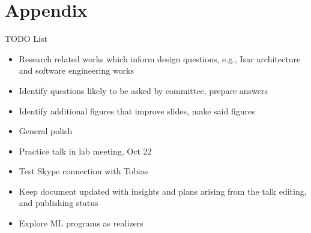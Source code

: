 \documentclass[slidestop,aspectratio=169]{beamer}
\theoremstyle{plain}
\theoremstyle{definition}
\theoremstyle{remark}
\begin{document}



\appendix
\section{Appendix}

\begin{frame}[t,allowframebreaks]{TODO List}
  \begin{itemize}
  \item Research related works which inform design questions, e.g., Isar architecture and software engineering works
  \item Identify questions likely to be asked by committee, prepare answers
  \item Identify additional figures that improve slides, make said figures
  \item General polish
  \item Practice talk in lab meeting, Oct 22
  \item Test Skype connection with Tobias
  \item Keep document updated with insights and plans arising from the talk editing, and publishing status
  \item Explore ML programs as realizers
  \end{itemize}
\end{frame}
\end{document}
